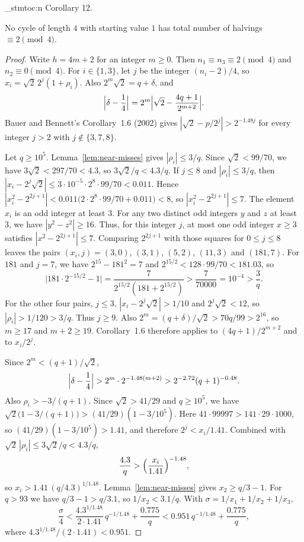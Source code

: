 \documentclass[11pt]{article}
\newenvironment{named}[1]{%
  \par\addvspace{\medskipamount}%
  \pagebreak[3]%
  \noindent{\bfseries #1}\space\ignorespaces
  \stmtoc{#1}%
}{\par\addvspace{\medskipamount}}
\newcommand{\stmtoc}[1]{ \qn_stmtoc:n {#1} }
\begin{document}
\begin{named}{Corollary 12.}
No cycle of length $4$ with starting value $1$ has total number of halvings $\equiv 2 \pmod{4}$.
\end{named}

\begin{proof}
Write $h = 4m + 2$ for an integer $m \ge 0$.
Then $n_1 \equiv n_3 \equiv 2 \pmod{4}$ and $n_2 \equiv 0 \pmod{4}$.
For $i \in \{1, 3\}$, let $j$ be the integer $(n_i - 2)/4$, so $x_i = \sqrt{2}\, 2^{j}(1+\rho_i)$.
Also $2^m \sqrt{2} = q + \delta$, and
\[
\Bigl|\delta - \frac14\Bigr| = 2^m \Bigl|\sqrt{2} - \frac{4q+1}{2^{m+2}}\Bigr|.
\]
Bauer and Bennett's Corollary~1.6 (2002) gives $|\sqrt{2} - p/2^j| > 2^{-1.48 j}$ for every integer $j > 2$ with $j \notin \{3, 7, 8\}$.

Let $q \ge 10^5$.
Lemma~\ref{lem:near-misses} gives $|\rho_i| \le 3/q$.
Since $\sqrt{2} < 99/70$, we have $3\sqrt{2} < 297/70 < 4.3$, so $3\sqrt{2}/q < 4.3/q$.
If $j \le 8$ and $|\rho_i| \le 3/q$, then $|x_i - 2^j \sqrt{2}| \le 3 \cdot 10^{-5} \cdot 2^8 \cdot 99/70 < 0.011$.
Hence $|x_i^2 - 2^{2j+1}| < 0.011\bigl(2 \cdot 2^8 \cdot 99/70 + 0.011\bigr) < 8$, so $|x_i^2 - 2^{2j+1}| \le 7$.
The element $x_i$ is an odd integer at least $3$.
For any two distinct odd integers $y$ and $z$ at least $3$, we have $|y^2 - z^2| \ge 16$.
Thus, for this integer $j$, at most one odd integer $x \ge 3$ satisfies $|x^2 - 2^{2j+1}| \le 7$.
Comparing $2^{2j+1}$ with those squares for $0 \le j \le 8$ leaves the pairs $(x_i, j) = (3, 0)$, $(3, 1)$, $(5, 2)$, $(11, 3)$ and $(181, 7)$.
For $181$ and $j = 7$, we have $2^{15} - 181^2 = 7$ and $2^{15/2} < 128 \cdot 99/70 < 181.03$, so
\[
\bigl|181 \cdot 2^{-15/2} - 1\bigr| = \frac{7}{2^{15/2}(181 + 2^{15/2})} > \frac{7}{70000} = 10^{-4} > \frac{3}{q}.
\]
For the other four pairs, $j \le 3$, $|x_i - 2^j \sqrt{2}| > 1/10$ and $2^j \sqrt{2} < 12$, so $|\rho_i| > 1/120 > 3/q$.
Thus $j \ge 9$.
Also $2^m = (q+\delta)/\sqrt{2} > 70q/99 > 2^{16}$, so $m \ge 17$ and $m+2 \ge 19$.
Corollary~1.6 therefore applies to $(4q+1)/2^{m+2}$ and to $x_i/2^j$.

Since $2^m < (q+1)/\sqrt{2}$,
\[
\Bigl|\delta - \frac14\Bigr| > 2^m \cdot 2^{-1.48(m+2)} > 2^{-2.72}(q+1)^{-0.48}.
\]
Also $\rho_i > -3/(q+1)$.
Since $\sqrt{2} > 41/29$ and $q \ge 10^5$, we have $\sqrt{2}\bigl(1 - 3/(q+1)\bigr) > (41/29)(1 - 3/10^5)$.
Here $41 \cdot 99997 > 141 \cdot 29 \cdot 1000$, so $(41/29)(1 - 3/10^5) > 1.41$, and therefore $2^j < x_i/1.41$.
Combined with $\sqrt{2}\,|\rho_i| \le 3\sqrt{2}/q < 4.3/q$,
\[
\frac{4.3}{q} > \Bigl(\frac{x_i}{1.41}\Bigr)^{-1.48},
\]
so $x_i > 1.41\,(q/4.3)^{1/1.48}$.
Lemma~\ref{lem:near-misses} gives $x_2 \ge q/3 - 1$.
For $q > 93$ we have $q/3 - 1 > q/3.1$, so $1/x_2 < 3.1/q$.
With $\sigma = 1/x_1 + 1/x_2 + 1/x_3$,
\[
\frac{\sigma}{4} < \frac{4.3^{1/1.48}}{2 \cdot 1.41}\, q^{-1/1.48} + \frac{0.775}{q} < 0.951\, q^{-1/1.48} + \frac{0.775}{q},
\]
where $4.3^{1/1.48}/(2 \cdot 1.41) < 0.951$.


\end{proof}
\end{document}
